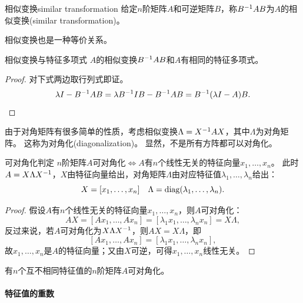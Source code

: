 \begin{definition}
	{相似变换}{similar transformation}
	给定$n$阶矩阵$A$和可逆矩阵$B$，称$B^{-1} AB$为$A$的相似变换(similar transformation)。
\end{definition}

\begin{corollary}
	相似变换也是一种等价关系。
\end{corollary}

\begin{theorem}{相似变换与特征多项式}{}
	$A$的相似变换$B^{-1} AB$和$A$有相同的特征多项式。
\end{theorem}
\begin{proof} 
	对下式两边取行列式即证。
	\[
		\lambda I - B^{-1} AB = \lambda B^{-1} IB - B^{-1} AB = B^{-1}(\lambda I - A)B.
		\qedhere
	\]
\end{proof}

由于对角矩阵有很多简单的性质，考虑相似变换$\Lambda = X^{-1} AX$，其中$\Lambda$为对角矩阵。
这称为对角化(diagonalization)。
显然，不是所有方阵都可以对角化。

\begin{theorem}{可对角化判定}{}
	$n$阶矩阵$A$可对角化$\iff A$有$n$个线性无关的特征向量$x_1,\ldots,x_n$。
	\tcblower
	此时$A = X\Lambda X^{-1}$，$X$由特征向量给出，对角矩阵$\Lambda$由对应特征值$\lambda_1,\ldots,\lambda_n$给出：
	\begin{equation}
		X = [x_1,\ldots,x_n]
		\quad
	\Lambda = \operatorname{diag}(\lambda_1,\ldots,\lambda_n).
	\end{equation}
\end{theorem}

\begin{proof}
	假设$A$有$n$个线性无关的特征向量$x_1,\ldots,x_n$，则$A$可对角化：
	\[
		AX = [Ax_1,\ldots,Ax_n] = [\lambda_1x_1,\ldots,\lambda_nx_n] = X\Lambda,
	\]
	反过来说，若$A$可对角化为$X\Lambda X^{-1}$，则$AX = X\Lambda$，即
	\[
		[Ax_1,\ldots,Ax_n] = [\lambda_1x_1,\ldots,\lambda_nx_n],
	\]
	故$x_1,\ldots,x_n$是$A$的特征向量；又由$X$可逆，可得$x_1,\ldots,x_n$线性无关。
\end{proof}

\begin{corollary}
	有$n$个互不相同特征值的$n$阶矩阵$A$可对角化。
\end{corollary}

\paragraph{特征值的重数}

